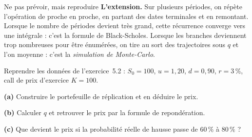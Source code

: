 \begin{generalisation}{Ne pas prévoir, mais reproduire}
\medskip
\textbf{L'extension.} Sur plusieurs périodes, on répète l'opération de proche en
proche, en partant des dates terminales et en remontant. Lorsque le nombre de
périodes devient très grand, cette récurrence converge vers une intégrale : c'est
la formule de Black-Scholes. Lorsque les branches deviennent trop nombreuses pour
être énumérées, on tire au sort des trajectoires sous $q$ et l'on moyenne : c'est
la \emph{simulation de Monte-Carlo}.
\end{generalisation}

\begin{center}
\end{center}

\begin{exercice}
Reprendre les données de l'exercice~5.2 : $S_0 = 100$, $u = 1{,}20$,
$d = 0{,}90$, $r = 3\,\%$, call de prix d'exercice $K = 100$.

\textbf{(a)} Construire le portefeuille de réplication et en déduire le prix.

\textbf{(b)} Calculer $q$ et retrouver le prix par la formule de repondération.

\textbf{(c)} Que devient le prix si la probabilité réelle de hausse passe de
$60\,\%$ à $80\,\%$ ?
\end{exercice}

